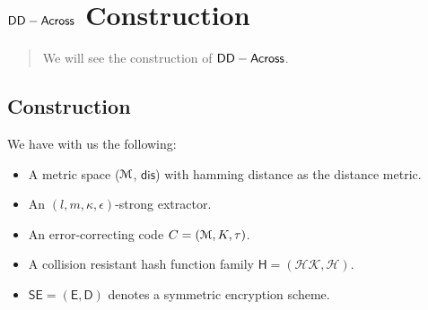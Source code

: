 \chapter{$ \mathsf{DD-Across} $ Construction}
\label{chap:constr}

\begin{quote} \small
	We will see the construction of $ \mathsf{DD-Across} $.
\end{quote}

\section{Construction}

We have with us the following:
\begin{itemize}
	\item A metric space ($\mathcal{M}$, $\mathsf{dis}$)  with hamming distance as the distance metric.
	\item An $(l,m,\kappa,\epsilon)$-strong extractor.
	\item An error-correcting code $C = (\mathcal{M}, K, \tau)$.
	\item A collision resistant hash function family $\mathsf{H}=(\mathcal{HK, H})$.
	\item $\mathsf{SE = (E,D)}$ denotes a symmetric encryption scheme.
\end{itemize}

